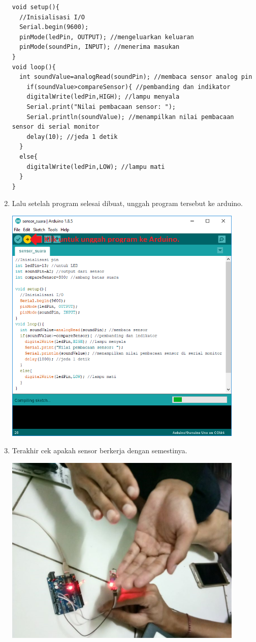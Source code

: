 \begin{enumerate}
\begin{verbatim}
void setup(){
  //Inisialisasi I/O
  Serial.begin(9600);
  pinMode(ledPin, OUTPUT); //mengeluarkan keluaran
  pinMode(soundPin, INPUT); //menerima masukan
}
void loop(){
  int soundValue=analogRead(soundPin); //membaca sensor analog pin
    if(soundValue>compareSensor){ //pembanding dan indikator
    digitalWrite(ledPin,HIGH); //lampu menyala
    Serial.print("Nilai pembacaan sensor: ");
    Serial.println(soundValue); //menampilkan nilai pembacaan sensor di serial monitor
    delay(10); //jeda 1 detik
  }
  else{
    digitalWrite(ledPin,LOW); //lampu mati
  }
}
\end{verbatim}
\item Lalu setelah program selesai dibuat, unggah program tersebut ke arduino.
\break\\
\centerline{\includegraphics[width=0.9\textwidth]{figures/ss11.png}}
\item Terakhir cek apakah sensor berkerja dengan semestinya.
\break\\
\centerline{\includegraphics[width=0.9\textwidth]{figures/ss12.jpeg}}

\end{enumerate}
